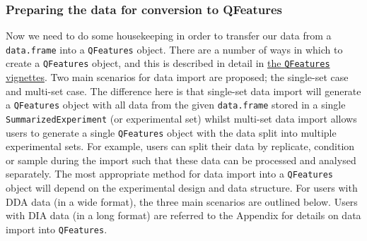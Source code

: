 \documentclass[9pt,a4paper,]{extarticle}
\begin{document}
\subsubsection{Preparing the data for conversion to QFeatures}\label{preparing-the-data-for-conversion-to-qfeatures}

Now we need to do some housekeeping in order to transfer our data from a
\texttt{data.frame} into a \texttt{QFeatures} object. There are a number of ways in which to create
a \texttt{QFeatures} object, and this is described in detail in \href{https://www.bioconductor.org/packages/release/bioc/vignettes/QFeatures/inst/doc/read_QFeatures.html}{the \texttt{QFeatures} vignettes}.
Two main scenarios for data import are proposed; the single-set case and
multi-set case. The difference here is that single-set data import will generate
a \texttt{QFeatures} object with all data from the given \texttt{data.frame} stored in a
single \texttt{SummarizedExperiment} (or experimental set) whilst multi-set data import
allows users to generate a single \texttt{QFeatures} object with the data split into
multiple experimental sets. For example, users can split their data by
replicate, condition or sample during the import such that these data can be
processed and analysed separately. The most appropriate method for data import
into a \texttt{QFeatures} object will depend on the experimental design and data
structure. For users with DDA data (in a wide format), the three main scenarios
are outlined below. Users with DIA data (in a long format) are referred to the Appendix
for details on data import into \texttt{QFeatures}.
\end{document}

